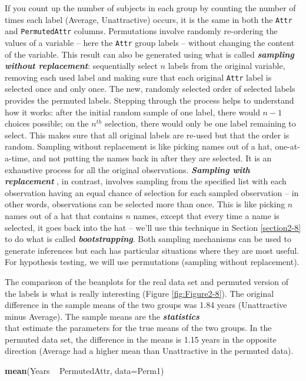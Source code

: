 \documentclass[]{book}
\newenvironment{Shaded}{\begin{snugshade}}{\end{snugshade}}
\newcommand{\KeywordTok}[1]{\textcolor[rgb]{0.13,0.29,0.53}{\textbf{{#1}}}}
\newcommand{\DataTypeTok}[1]{\textcolor[rgb]{0.13,0.29,0.53}{{#1}}}
\newcommand{\StringTok}[1]{\textcolor[rgb]{0.31,0.60,0.02}{{#1}}}
\newcommand{\NormalTok}[1]{{#1}}
\begin{document}
If you count up the number of subjects in each group by counting the
number of times each label (Average, Unattractive) occurs, it is the
same in both the \texttt{Attr} and \texttt{PermutedAttr} columns.
Permutations involve randomly re-ordering the values of a variable --
here the \texttt{Attr} group labels -- without changing the content of
the variable. This result can also be generated using what is called
\textbf{\emph{sampling without replacement}}: sequentially select \(n\)
labels from the original variable, removing each used label and making
sure that each original \texttt{Attr} label is selected once and only
once. The new, randomly selected order of selected labels provides the
permuted labels. Stepping through the process helps to understand how it
works: after the initial random sample of one label, there would
\(n - 1\) choices possible; on the \(n^{th}\) selection, there would
only be one label remaining to select. This makes sure that all original
labels are re-used but that the order is random. Sampling without
replacement is like picking names out of a hat, one-at-a-time, and not
putting the names back in after they are selected. It is an exhaustive
process for all the original observations. \textbf{\emph{Sampling with
replacement}} , in contrast, involves sampling from the specified list
with each observation having an equal chance of selection for each
sampled observation -- in other words, observations can be selected more
than once. This is like picking \(n\) names out of a hat that contains
\(n\) names, except that every time a name is selected, it goes back
into the hat -- we'll use this technique in Section \ref{section2-8} to
do what is called \textbf{\emph{bootstrapping}}. Both sampling
mechanisms can be used to generate inferences but each has particular
situations where they are most useful. For hypothesis testing, we will
use permutations (sampling without replacement).

The comparison of the beanplots for the real data set and permuted
version of the labels is what is really interesting (Figure
\ref{fig:Figure2-8}). The original difference in the sample means of the
two groups was 1.84 years (Unattractive minus Average). The sample means
are the \textbf{\emph{statistics}}\\
that estimate the parameters for the true means of the two groups. In
the permuted data set, the difference in the means is 1.15 years in the
opposite direction (Average had a higher mean than Unattractive in the
permuted data).

\begin{Shaded}
\begin{Highlighting}[]
\KeywordTok{mean}\NormalTok{(Years ~}\StringTok{ }\NormalTok{PermutedAttr, }\DataTypeTok{data=}\NormalTok{Perm1)}
\end{Highlighting}
\end{Shaded}
\end{document}
